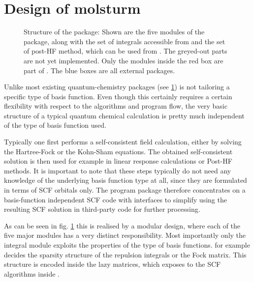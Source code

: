 \section{Design of molsturm}
\begin{figure}
	\centering
	\caption[Structure of the \molsturm package]{%
	Structure of the \molsturm package: Shown are the five modules of the package,
	along with the set of integrals accessible from \gint and the set of post-HF method,
	which can be used from \molsturm. The greyed-out parts are not yet implemented.
	Only the modules inside the red box are part of \molsturm. The blue boxes are all external packages.}
	\label{fig:structureMolsturm}
\end{figure}









Unlike most existing quantum-chemistry packages
\molsturm (see \ref{fig:structureMolsturm}) is not tailoring
a specific type of basis function.
Even though this certainly requires
a certain flexibility with respect to the algorithms
and program flow,
the very basic structure of a typical quantum chemical
calculation is pretty much independent
of the type of basis function used.

Typically one first performs a self-consistent field calculation,
either by solving the Hartree-Fock or the Kohn-Sham equations.
The obtained self-consistent solution is then used for example in
linear response calculations or Post-HF methods.
It is important to note that these steps
typically do not need any knowledge of the underlying basis function type
at all, since they are formulated in terms of SCF orbitals only.
The \molsturm program package therefore concentrates
on a basis-function independent SCF code
with interfaces to simplify using the resulting SCF solution
in third-party code for further processing.

As can be seen in fig. \ref{fig:structureMolsturm} this is realised
by a modular design,
where each of the five major modules has a very
distinct responsibility.
Most importantly only the integral module \gint
exploits the properties of the type of basis functions.
\gint for example decides the sparsity structure of the
repulsion integrals or the Fock matrix.
This structure is encoded inside the lazy matrices,
which \gint exposes to the SCF algorithms inside \gscf.

